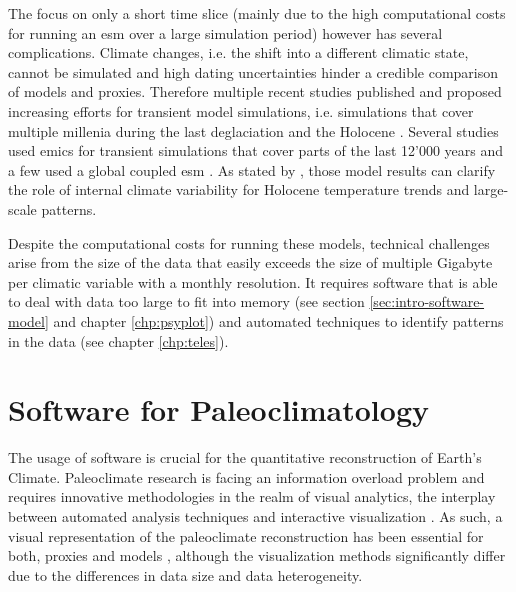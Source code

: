 \begin{refsection}
The focus on only a short time slice (mainly due to the high computational costs for running an \gls{esm} over a large simulation period) however has several complications. Climate changes, i.e. the shift into a different climatic state, cannot be simulated and high dating uncertainties hinder a credible comparison of models and proxies\addref. Therefore multiple recent studies published and proposed increasing efforts for transient model simulations, i.e. simulations that cover multiple millenia during the last deglaciation \citep{IvanovicGregoireKageyamaEtAl2016} and the Holocene \citep{Otto-BliesnerBraconnotHarrisonEtAl2017}. Several studies used \glspl{emic} for transient simulations that cover parts of the last 12'000 years \citep[e.g.][]{RocheRenssenPaillardEtAl2011, MenvielTimmermannTimmEtAl2011, GregoireValdesPayne2015} and a few used a global coupled \gls{esm} \citep[chapter \ref{chp:teles}]{VarmaPrangeMerkelEtAl2012, OttoBliesnerRussellClarkEtAl2014}. As stated by \cite{WeitzelWagnerSjolteEtAl2019}, those model results can clarify the role of internal climate variability for Holocene temperature trends and large-scale patterns.

Despite the computational costs for running these models, technical challenges arise from the size of the data that easily exceeds the size of multiple Gigabyte per climatic variable with a monthly resolution. It requires software that is able to deal with data too large to fit into memory (see section \ref{sec:intro-software-model} and chapter \ref{chp:psyplot}) and automated techniques to identify patterns in the data (see chapter \ref{chp:teles}).



\section{Software for Paleoclimatology} \label{sec:intro-software}

The usage of software is crucial for the quantitative reconstruction of Earth's Climate. Paleoclimate research is facing an information overload problem and requires innovative methodologies in the realm of visual analytics, the interplay between automated analysis techniques and interactive visualization \citep{KeimAndrienkoFeketeEtAl2008, Nocke2014}. As such, a visual representation of the paleoclimate reconstruction has been essential for both, proxies \citep{Nichols1967, Bradley1985, Grimm1988} and models \citep{Phillips1956, RautenhausBoettingerSiemenEtAl2018, NockeSterzelBoettingerEtAl2008, Nocke2014, BoettingerRoeber2019}, although the visualization methods significantly differ due to the differences in data size and data heterogeneity.


\end{refsection}
